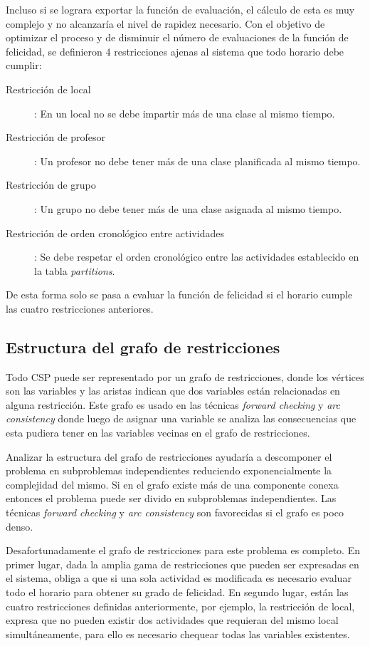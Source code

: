 Incluso si se lograra exportar la funci\'on de evaluaci\'on, el c\'alculo de esta es muy complejo y no alcanzar\'ia el nivel de rapidez necesario. Con el objetivo de optimizar el proceso y de disminuir el n\'umero de evaluaciones de la funci\'on de felicidad, se definieron 4 restricciones ajenas al sistema que todo horario debe cumplir:

\begin{description}

\item[Restricci\'on de local]: En un local no se debe impartir m\'as de una clase al mismo tiempo.
\item[Restricci\'on de profesor]: Un profesor no debe tener m\'as de una clase planificada al mismo tiempo.
\item[Restricci\'on de grupo]: Un grupo no debe tener m\'as de una clase asignada al mismo tiempo.
\item[Restricci\'on de orden cronol\'ogico entre actividades]: Se debe respetar el orden cronol\'ogico entre las actividades establecido en la tabla \emph{partitions}.

\end{description}

De esta forma solo se pasa a evaluar la funci\'on de felicidad si el horario cumple las cuatro restricciones anteriores.

\subsection{Estructura del grafo de restricciones}

Todo CSP puede ser representado por un grafo de restricciones, donde los v\'ertices son las variables y las aristas indican que dos variables est\'an relacionadas en alguna restricci\'on. Este grafo es usado en las t\'ecnicas \emph{forward checking} y \emph{arc consistency} donde luego de asignar una variable se analiza las consecuencias que esta pudiera tener en las variables vecinas en el grafo de restricciones.

Analizar la estructura del grafo de restricciones ayudar\'ia a descomponer el problema en subproblemas independientes reduciendo exponencialmente la complejidad del mismo. Si en el grafo existe m\'as de una componente conexa entonces el problema puede ser divido en subproblemas independientes. Las t\'ecnicas \emph{forward checking} y \emph{arc consistency} son favorecidas si el grafo es poco denso.

Desafortunadamente el grafo de restricciones para este problema es completo. En primer lugar, dada la amplia gama de restricciones que pueden ser expresadas en el sistema, obliga a que si una sola actividad es modificada es necesario evaluar todo el horario para obtener su grado de felicidad. En segundo lugar, est\'an las cuatro restricciones definidas anteriormente, por ejemplo, la restricci\'on de local, expresa que no pueden existir dos actividades que requieran del mismo local simult\'aneamente, para ello es necesario chequear todas las variables existentes. 

